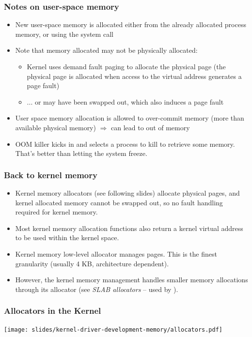 \begin{frame}
  \frametitle{Notes on user-space memory}
  \begin{itemize}
  \item New user-space memory is allocated either from the already
    allocated process memory, or using the  system call
  \item Note that memory allocated may not be physically allocated:
    \begin{itemize}
    \item Kernel uses demand fault paging to allocate the physical
      page (the physical page is allocated when access to the virtual
      address generates a page fault)
    \item ... or may have been swapped out, which also induces a page
      fault
    \end{itemize}
  \item User space memory allocation is allowed to over-commit memory
    (more than available physical memory) $\Rightarrow$ can lead to
    out of memory
  \item OOM killer kicks in and selects a process to kill to retrieve
    some memory.  That's better than letting the system freeze.
  \end{itemize}
\end{frame}

\begin{frame}
  \frametitle{Back to kernel memory}
  \begin{itemize}
  \item Kernel memory allocators (see following slides) allocate
    physical pages, and kernel allocated memory cannot be swapped out,
    so no fault handling required for kernel memory.
  \item Most kernel memory allocation functions also return a kernel
    virtual address to be used within the kernel space.
  \item Kernel memory low-level allocator manages pages. This is the
    finest granularity (usually 4 KB, architecture dependent).
  \item However, the kernel memory management handles smaller memory
    allocations through its allocator (see \emph{SLAB allocators}
    – used by ).
  \end{itemize}
\end{frame}

\begin{frame}
  \frametitle{Allocators in the Kernel}
  \begin{center}
    \texttt{[image: slides/kernel-driver-development-memory/allocators.pdf]}
  \end{center}
\end{frame}

